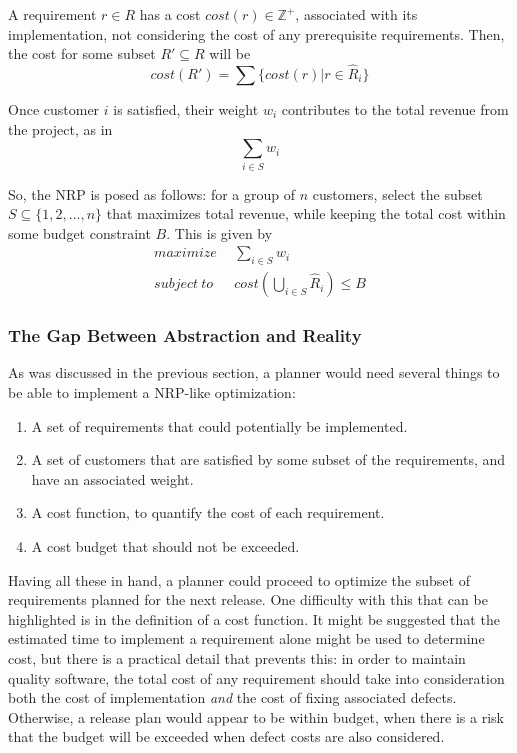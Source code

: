 \documentclass[a4paper]{scrartcl}
\begin{document}
A requirement $r \in R$ has a cost $cost(r) \in \mathbb{Z}^+$, associated with its implementation, not considering the cost of any prerequisite requirements. Then, the cost for some subset $R' \subseteq R$ will be
\begin{equation}
cost(R') = \sum \{cost(r) | r \in \hat{R}_i \}
\end{equation}

Once customer $i$ is satisfied, their weight $w_i$ contributes to the total revenue from the project, as in
\begin{equation}
\sum_{i \in S} w_i
\end{equation}

So, the NRP is posed as follows: for a group of $n$ customers, select the subset $S \subseteq \{ 1,2,...,n \}$ that maximizes total revenue, while keeping the total cost within some budget constraint $B$. This is given by 
\begin{equation}
\begin{split}
maximize~~& \sum_{i \in S} w_i \\
subject~to~~~& cost(\bigcup_{i \in S} \hat{R}_i) \le B
\end{split}
\end{equation}

\subsubsection*{The Gap Between Abstraction and Reality}
As was discussed in the previous section, a planner would need several things to be able to implement a NRP-like optimization:
\begin{enumerate}
\item{A set of requirements that could potentially be implemented.}
\item{A set of customers that are satisfied by some subset of the requirements, and have an associated weight.}
\item{A cost function, to quantify the cost of each requirement.}
\item{A cost budget that should not be exceeded.}
\end{enumerate}

Having all these in hand, a planner could proceed to optimize the subset of requirements planned for the next release. One difficulty with this that can be highlighted is in the definition of a cost function. It might be suggested that the estimated time to implement a requirement alone might be used to determine cost, but there is a practical detail that prevents this: in order to maintain quality software, the total cost of any requirement should take into consideration both the cost of implementation \emph{and} the cost of fixing associated defects. Otherwise, a release plan would appear to be within budget, when there is a risk that the budget will be exceeded when defect costs are also considered.
\end{document}
